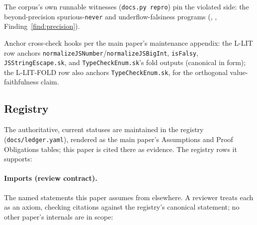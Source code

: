 \documentclass[11pt]{article}
\begin{document}
The corpus's own runnable witnesses (\texttt{docs.py repro}) pin the
violated side: the beyond-precision spurious-\texttt{never} and
underflow-falsiness programs
(,
,
Finding~\ref{find:precision}).

Anchor cross-check hooks per the main paper's maintenance appendix: the
L-LIT row anchors
\texttt{normalizeJSNumber}/\texttt{normalizeJSBigInt}, \texttt{isFalsy},
\texttt{JSStringEscape.sk}, and \texttt{TypeCheckEnum.sk}'s fold outputs
(canonical in form); the L-LIT-FOLD row also anchors
\texttt{TypeCheckEnum.sk}, for the orthogonal value-faithfulness claim.

\subsection{Registry}

The authoritative, current statuses are maintained in the registry
(\texttt{docs/ledger.yaml}), rendered as the main paper's Assumptions and
Proof Obligations tables; this paper is cited there as evidence. The
registry rows it supports:



\paragraph{Imports (review contract).}
The named statements this paper assumes from elsewhere. A reviewer treats
each as an axiom, checking citations against the registry's canonical
statement; no other paper's internals are in scope:


\end{document}

